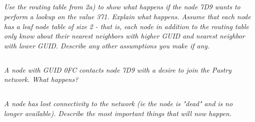\documentclass{article}
\newcommand{\question}[1]{\subsection{}\textit{#1}\bigskip}
\begin{document}
 \question{Use the routing table from 2a) to show what happens if the node 7D9 wants to perform a lookup on the value 371. Explain what happens. Assume that each node has a leaf node table of size 2 - that is, each node in addition to the routing table only know about their nearest neighbors with higher GUID and nearest neighbor with lower GUID. Describe any other assumptions you make if any.}

 \question{A node with GUID 0FC contacts node 7D9 with a desire to join the Pastry network. What happens?}

 \question{A node has lost connectivity to the network (ie the node is "dead" and is no longer available). Describe the most important things that will now happen.}

 
\end{document}
